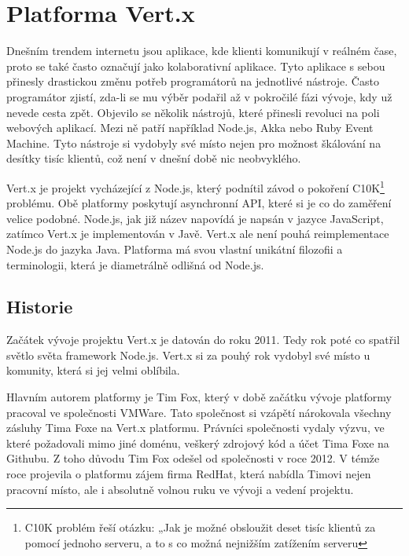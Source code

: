 
\chapter{Platforma Vert.x}

Dnešním trendem internetu jsou aplikace, kde klienti komunikují v reálném čase, proto se také často označují jako kolaborativní aplikace. Tyto aplikace s sebou přinesly drastickou změnu potřeb programátorů na jednotlivé nástroje. Často programátor zjistí, zda-li se mu výběr podařil až v pokročilé fázi vývoje, kdy už nevede cesta zpět. Objevilo se několik nástrojů, které přinesli revoluci na poli webových aplikací. Mezi ně patří například Node.js, Akka nebo Ruby Event Machine. 
Tyto nástroje si vydobyly své místo nejen pro možnost škálování na desítky tisíc klientů, což není v dnešní době nic neobvyklého. 

Vert.x je projekt vycházející z Node.js, který podnítil závod o pokoření C10K\footnote{C10K problém řeší otázku: „Jak je možné obsloužit deset tisíc klientů za pomocí jednoho serveru, a to s co možná nejnižším zatížením serveru} problému. Obě platformy poskytují asynchronní API, které si je co do zaměření velice podobné. Node.js, jak již název napovídá je napsán v jazyce JavaScript, zatímco Vert.x je implementován v Javě. Vert.x ale není pouhá reimplementace Node.js do jazyka Java. Platforma má svou vlastní unikátní filozofii a terminologii, která je diametrálně odlišná od Node.js.

\section{Historie}

Začátek vývoje projektu Vert.x je datován do roku 2011. Tedy rok poté co spatřil světlo světa framework Node.js. Vert.x si za pouhý rok vydobyl své místo u komunity, která si jej velmi oblíbila. 

Hlavním autorem platformy je Tim Fox, který v době začátku vývoje platformy pracoval ve společnosti VMWare. Tato společnost si vzápětí nárokovala všechny zásluhy Tima Foxe na Vert.x platformu. Právníci společnosti vydaly výzvu, ve které požadovali mimo jiné doménu, veškerý zdrojový kód a účet Tima Foxe na Githubu. Z toho důvodu Tim Fox odešel od společnosti v roce 2012. V témže roce projevila o platformu zájem firma RedHat, která nabídla Timovi nejen pracovní místo, ale i absolutně volnou ruku ve vývoji a vedení projektu\citep{whoControlVertx}. 

